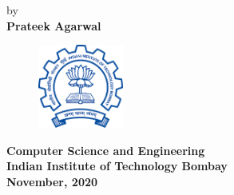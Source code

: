 \titlepage
\begin{center}

\\
\vspace{4mm}
\\
\end{center}
\vspace{55mm}
\begin{center}
by\\
\vspace{5mm}
{\bf{\Large Prateek Agarwal}}\\
\end{center}
\vspace{45mm}
\begin{figure}[h]
\centering
\includegraphics[width=0.25\textwidth]{./fig/iitblogo.png}

\end{figure}
\begin{center}
\vspace{3mm}
{\bf {\large { Computer Science and Engineering}}}\\
\vspace{2mm}
{\bf {\large { Indian Institute of Technology Bombay}}}\\
\vspace{3mm}
{\textbf{ November, 2020}}\\
\end{center}


